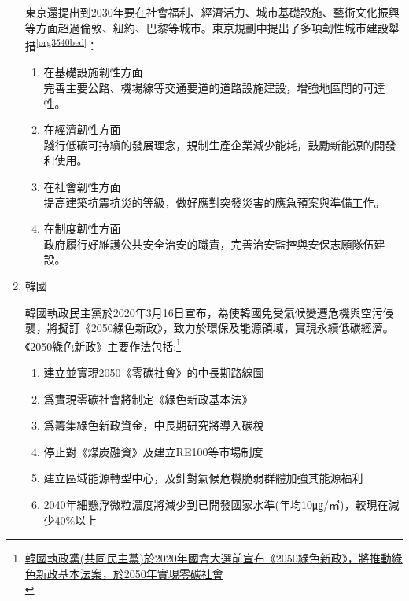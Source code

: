 \documentclass[a4paper,12pt]{article}
\begin{document}
\begin{enumerate}
東京還提出到2030年要在社會福利、經濟活力、城市基礎設施、藝術文化振興等方面超過倫敦、紐約、巴黎等城市。東京規劃中提出了多項韌性城市建設舉措\textsuperscript{\ref{org3540bed}}：\\
\begin{enumerate}
\item 在基礎設施韌性方面\\
完善主要公路、機場線等交通要道的道路設施建設，增強地區間的可達性。\\
\item 在經濟韌性方面\\
踐行低碳可持續的發展理念，規制生產企業減少能耗，鼓勵新能源的開發和使用。\\
\item 在社會韌性方面\\
提高建築抗震抗災的等級，做好應對突發災害的應急預案與準備工作。\\
\item 在制度韌性方面\\
政府履行好維護公共安全治安的職責，完善治安監控與安保志願隊伍建設。\\
\end{enumerate}

\item 韓國
\label{sec:org22ade43}

韓國執政民主黨於2020年3月16日宣布，為使韓國免受氣候變遷危機與空污侵襲，將擬訂《2050綠色新政》，致力於環保及能源領域，實現永續低碳經濟。《2050綠色新政》主要作法包括:\footnote{\href{https://km.twenergy.org.tw/Data/db\_more?id=3758}{韓國執政黨(共同民主黨)於2020年國會大選前宣布《2050綠色新政》，將推動綠色新政基本法案，於2050年實現零碳社會}\\\label{orga8f8929}}\\
\begin{enumerate}
\item 建立並實現2050《零碳社會》的中長期路線圖\\
\item 爲實現零碳社會將制定《綠色新政基本法》\\
\item 爲籌集綠色新政資金，中長期研究將導入碳稅\\
\item 停止對《煤炭融資》及建立RE100等市場制度\\
\item 建立區域能源轉型中心，及針對氣候危機脆弱群體加強其能源福利\\
\item 2040年細懸浮微粒濃度將減少到已開發國家水準(年均10㎍/㎥)，較現在減少40\%以上\\
\end{enumerate}


\end{enumerate}
\end{document}
